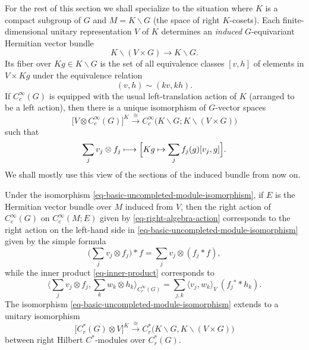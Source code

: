 \documentclass[leqno,11pt]{amsart}
\numberwithin{equation}{subsection}
\theoremstyle{plain}
\theoremstyle{definition}
\theoremstyle{remark}
\begin{document}
For the rest of this section we shall specialize to the situation where    $K$ is a compact subgroup of $G$ and   $M = K \backslash G$ (the space of right $K$-cosets).  Each   finite-dimensional unitary representation $V$ of $K$ determines an \emph{induced}   $G$-equivariant   Hermitian vector bundle  
\[
  K \backslash ( V \times G) \to K \backslash G.
\]
Its fiber  over $Kg\in K\backslash G$ is the set of all equivalence classes $[v,h]$ of elements in $ V\times Kg$ under the equivalence relation 
\[
(v,h)\sim (kv,kh).
\]
If $C_c^\infty (G)$ is equipped with the usual left-translation action of $K$ (arranged to be a left action), then     there is a unique  isomorphism of $G$-vector spaces 
\begin{equation}
    \label{eq-basic-uncompleted-module-isomorphism}
\bigl [  V \otimes C_c^\infty (G) \bigr ]^K \stackrel \cong \longrightarrow C_c^\infty \bigl (K \backslash G; K \backslash ( V {\times} G)
\bigr)  
\end{equation}
 such that 
\[
 \sum_j  v_j \otimes f_j   \longmapsto \Bigl [ Kg \mapsto  \sum_j   f_j(g) [ v_j,g]\Bigr].
\]
We shall mostly use this view of the sections of the induced bundle from now on. 

Under the isomorphism \eqref{eq-basic-uncompleted-module-isomorphism}, if $E$ is the Hermitian vector bundle over $M$ induced from $V$, then the right action of $C_c^\infty (G)$ on $ C_c^\infty (M;E)  $ given by \eqref{eq-right-algebra-action} corresponds to the right action on the left-hand side in \eqref{eq-basic-uncompleted-module-isomorphism}  given by the simple formula
\[
\bigl (  \sum_j v_j \otimes f_j    \bigr)  * f =  \sum_j v_j \otimes (f_j* f)     ,
\]
while the inner product \eqref{eq-inner-product} corresponds to   
\[
\bigl \langle   \sum_j  v_j\otimes f_j   ,  
 \sum_k w_k\otimes h_k      \bigr \rangle_{C_c^\infty (G)} =
 \sum_{j,k}  \langle v_j,w_k\rangle_{V} \ ( f_j{}^* * h_k ) .
\]
The isomorphism \eqref{eq-basic-uncompleted-module-isomorphism}  extends to a unitary isomorphism 
\begin{equation}
    \label{eq-basic-hilbert-module-isomorphism}
 \bigl [ C^*_r (G) \otimes V\bigr]^K \stackrel \cong\longrightarrow  C^*_r \bigl (K \backslash G, K \backslash ( V {\times} G) \bigr )
\end{equation}
between right Hilbert $C^*$-modules over $C^*_r (G)$.
 
\end{document}
